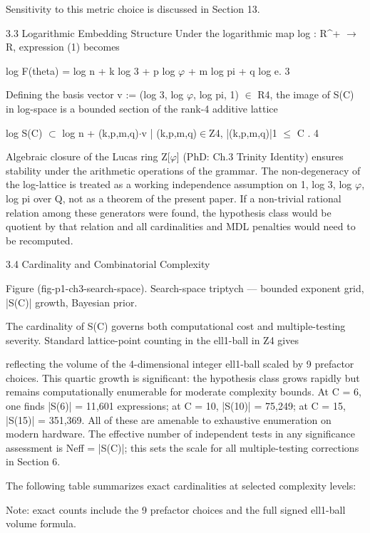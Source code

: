   Sensitivity to this metric choice is discussed in Section 13.

  3.3 Logarithmic Embedding Structure
  Under the logarithmic map log : R\textasciicircum{}+ $\rightarrow$ R, expression (1) becomes

  log F(theta) = log n + k log 3 + p log $\varphi$ + m log pi + q log e. 3

  Defining the basis vector v := (log 3, log $\varphi$, log pi, 1) $\in$ R4, the image of S(C) in
  log-space is a bounded section of the rank-4 additive lattice

  log S(C) $\subset$ { log n + (k,p,m,q)$\cdot$v | (k,p,m,q)$\in$Z4, |(k,p,m,q)|1 $\leq$ C }. 4

  Algebraic closure of the Lucas ring Z[$\varphi$] (PhD: Ch.3 Trinity Identity) ensures stability
  under the arithmetic operations of the grammar. The non-degeneracy of the log-lattice
  is treated as a working independence assumption on {1, log 3, log $\varphi$, log pi} over Q, not
  as a theorem of the present paper. If a non-trivial rational relation among these
  generators were found, the hypothesis class would be quotient by that relation and all
  cardinalities and MDL penalties would need to be recomputed.

  3.4 Cardinality and Combinatorial Complexity

  Figure (fig-p1-ch3-search-space). Search-space triptych --- bounded exponent grid, |S(C)| growth,
                                          Bayesian prior.

  The cardinality of S(C) governs both computational cost and multiple-testing severity.
  Standard lattice-point counting in the ell1-ball in Z4 gives

  reflecting the volume of the 4-dimensional integer ell1-ball scaled by 9 prefactor
  choices. This quartic growth is significant: the hypothesis class grows rapidly but
  remains computationally enumerable for moderate complexity bounds. At C = 6, one
  finds |S(6)| = 11{,}601 expressions; at C = 10, |S(10)| = 75{,}249; at C = 15, |S(15)| =
  351{,}369. All of these are amenable to exhaustive enumeration on modern hardware.
  The effective number of independent tests in any significance assessment is Neff =
  |S(C)|; this sets the scale for all multiple-testing corrections in Section 6.

  The following table summarizes exact cardinalities at selected complexity levels:

  Note: exact counts include the 9 prefactor choices and the full signed ell1-ball volume
  formula.

